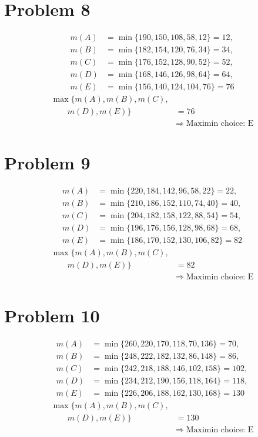 \section*{Problem 8}
\[
	\begin{aligned}
	m(A) &= \min\{190,150,108,58,12\}=12,\\
	m(B) &= \min\{182,154,120,76,34\}=34,\\
	m(C) &= \min\{176,152,128,90,52\}=52,\\
	m(D) &= \min\{168,146,126,98,64\}=64,\\
	m(E) &= \min\{156,140,124,104,76\}=76
	\end{aligned}
	\]
	\[
	\begin{aligned}
	\max\{m(A),m(B),m(C),\\
	\qquad m(D),m(E)\} &= 76\\
	&\Rightarrow\;\text{Maximin choice: E}
	\end{aligned}
	\]

\section*{Problem 9}
\[
	\begin{aligned}
	m(A) &= \min\{220,184,142,96,58,22\}=22,\\
	m(B) &= \min\{210,186,152,110,74,40\}=40,\\
	m(C) &= \min\{204,182,158,122,88,54\}=54,\\
	m(D) &= \min\{196,176,156,128,98,68\}=68,\\
	m(E) &= \min\{186,170,152,130,106,82\}=82
	\end{aligned}
	\]
	\[
	\begin{aligned}
	\max\{m(A),m(B),m(C),\\
	\qquad m(D),m(E)\} &= 82\\
	&\Rightarrow\;\text{Maximin choice: E}
	\end{aligned}
	\]

\section*{Problem 10}
\[
	\begin{aligned}
	m(A) &= \min\{260,220,170,118,70,136\}=70,\\
	m(B) &= \min\{248,222,182,132,86,148\}=86,\\
	m(C) &= \min\{242,218,188,146,102,158\}=102,\\
	m(D) &= \min\{234,212,190,156,118,164\}=118,\\
	m(E) &= \min\{226,206,188,162,130,168\}=130
	\end{aligned}
	\]
	\[
	\begin{aligned}
	\max\{m(A),m(B),m(C),\\
	\qquad m(D),m(E)\} &= 130\\
	&\Rightarrow\;\text{Maximin choice: E}
	\end{aligned}
	\]





